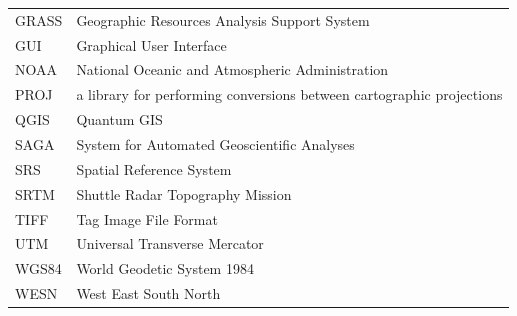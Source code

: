 \documentclass[technologies,article,accept,pdftex,moreauthors]{Definitions/mdpi}
\begin{document}
{\noindent 
\begin{tabular}{@{}ll}
GRASS & Geographic Resources Analysis Support System \\
GUI & Graphical User Interface \\
NOAA & National Oceanic and Atmospheric Administration \\
PROJ & a library for performing conversions between cartographic projections \\
QGIS & Quantum GIS \\ 
SAGA & System for Automated Geoscientific Analyses \\
SRS & Spatial Reference System \\
SRTM & Shuttle Radar Topography Mission\\
TIFF & Tag Image File Format \\
UTM & Universal Transverse Mercator \\
WGS84 & World Geodetic System 1984\\
WESN & West East South North
\end{tabular}
}
\end{document}
